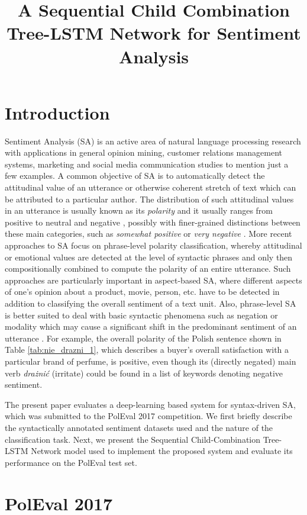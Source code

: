 \documentclass[10pt, a4paper]{article}
\title{A Sequential Child Combination Tree-LSTM Network for Sentiment Analysis}
\begin{document}
\maketitleabstract

\section{Introduction}   
Sentiment Analysis (SA) is an active area of natural language processing research with applications in general opinion mining, customer relations management systems, marketing and social media communication studies to mention just a few examples. A common objective of SA is to automatically detect the attitudinal value of an utterance or otherwise coherent stretch of text which can be attributed to a particular author. The distribution of  such attitudinal values in an utterance is usually known as its \textit{polarity} and it usually ranges from positive to neutral and negative \cite{cambria_schuller}, possibly with finer-grained distinctions between these main categories, such as \textit{somewhat positive} or \textit{very negative} \cite{socher2013recursive}. More recent approaches to SA focus on phrase-level polarity classification, whereby attitudinal or emotional values are detected at the level of syntactic phrases and only then compositionally combined to compute the polarity of an entire utterance. Such approaches are particularly important in aspect-based SA, where different aspects of one's opinion about a product, movie, person, etc. have to be detected in addition to  classifying the overall sentiment of a text unit. Also, phrase-level SA is better suited to deal with basic syntactic phenomena such as negation or modality which may cause a significant shift in the predominant sentiment of an utterance \cite{wilson_wiebe}. For example, the overall polarity of the Polish sentence shown in Table \ref{tab:nie_drazni_1}, which describes a buyer's overall satisfaction with a particular brand of perfume, is positive, even though its (directly negated) main verb \textit{drażnić} (irritate) could be found in a list of keywords denoting negative sentiment. 
\par The present paper evaluates a deep-learning based system for syntax-driven SA, which was submitted to the PolEval 2017 competition. We first briefly describe the syntactically annotated sentiment datasets used and the nature of the classification task. Next, we present the Sequential Child-Combination Tree-LSTM Network model used to implement the proposed system and evaluate its performance on the PolEval test set.


\section{PolEval 2017}
\end{document}
